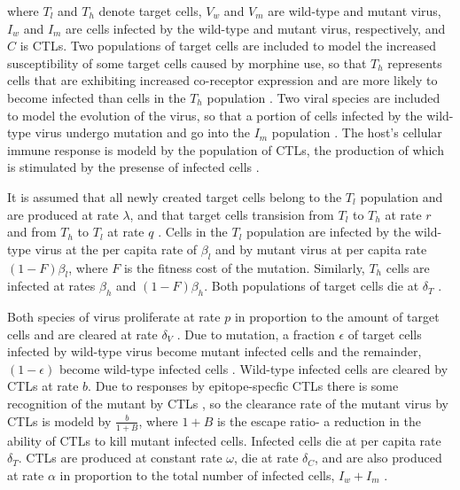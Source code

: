 \documentclass[11pt, oneside]{article}    %
\begin{document}
where $T_l$ and $T_h$ denote target cells, $V_w$ and $V_m$ are wild-type and mutant virus, $I_w$ and $I_m$ are cells infected by the wild-type and mutant virus, respectively, and $C$ is CTLs. Two populations of target cells are included to model the increased susceptibility of some target cells caused by morphine use, so that $T_h$ represents cells that are exhibiting increased co-receptor expression and are more likely to become infected than cells in the $T_h$ population \cite{Vaidya}. Two viral species are included to model the evolution of the virus, so that a portion of cells infected by the wild-type virus undergo mutation and go into the $I_m$ population \cite{Konrad}. The host's cellular immune response is modeld by the population of CTLs, the production of which is stimulated by the presense of infected cells \cite{Konrad}.

\vspace{5mm}

It is assumed that all newly created target cells belong to the $T_l$ population and are produced at rate $\lambda$, and that target cells transision from $T_l$ to $T_h$ at rate $r$ and from $T_h$ to $T_l$ at rate $q$ \cite{Vaidya}. Cells in the $T_l$ population are infected by the wild-type virus at the per capita rate of $\beta_l$ and by mutant virus at per capita rate $(1-F) \beta_l$, where $F$ is the fitness cost of the mutation. Similarly, $T_h$ cells are infected at rates $\beta_h$ and $(1-F) \beta_h$. Both populations of target cells die at $\delta_T$ \cite{Perelson, Schwartz}. 

\vspace{5mm}

Both species of virus proliferate at rate $p$ in proportion to the amount of target cells and are cleared at rate $\delta_V$ \cite{Konrad}. Due to mutation, a fraction $\epsilon$ of target cells infected by wild-type virus become mutant infected cells and the remainder, $(1-\epsilon)$ become wild-type infected cells \cite{Konrad}. Wild-type infected cells are cleared by CTLs at rate $b$. Due to responses by epitope-specfic CTLs there is some recognition of the mutant by CTLs \cite{Konrad,Barouch}, so the clearance rate of the mutant virus by CTLs is modeld by $\frac{b}{1+B}$, where $1+B$ is the escape ratio- a reduction in the ability of CTLs to kill mutant infected cells. Infected cells die at per capita rate $\delta_T$. CTLs are produced at constant rate $\omega$, die at rate $\delta_C$, and are also produced at rate $\alpha$ in proportion to the total number of infected cells, $I_w + I_m$ \cite{Konrad}.
\end{document}
